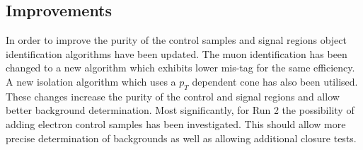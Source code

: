 \subsection{Improvements}

In order to improve the purity of the control samples 
and signal regions
object identification algorithms have been updated. The 
muon identification
has been changed to a new algorithm which exhibits lower 
mis-tag for the same
efficiency. A new isolation algorithm which uses a $p_T$ 
dependent cone has also been utilised. These changes 
increase the purity 
of the control and signal regions and allow better 
background determination. 
Most significantly, for Run 2 the possibility of adding 
electron control 
samples has been investigated. This should allow more 
precise determination of backgrounds as well as allowing 
additional closure tests.  


